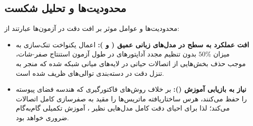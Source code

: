 \subsection{محدودیت‌ها و تحلیل شکست}
محدودیت‌ها و عوامل موثر بر افت دقت در آزمون‌ها عبارتند از:
\begin{itemize}
    \item \textbf{افت عملکرد به سطح  در مدل‌های زبانی عمیق ( و ):} اعمال یکنواخت تنک‌سازی به میزان $50\%$ بدون تنظیم مجدد آداپتورهای  در طول آزمون استنتاج صفر-شات، موجب حذف بخش‌هایی از اتصالات حیاتی در لایه‌های میانی شبکه شده که منجر به تنزل دقت در دسته‌بندی توالی‌های ظریف شده است.
    \item \textbf{نیاز به بازیابی آموزش ():} بر خلاف روش‌های فاکتورگیری که هندسه فضای پیوسته را حفظ می‌کنند، هرس ساختاریافته ماتریس‌ها را مقید به صفرسازی کامل اتصالات می‌کند؛ لذا برای احیای دقت کامل مدل‌هایی نظیر ، آموزش تکمیلی گام‌به‌گام ضروری خواهد بود.
\end{itemize}
